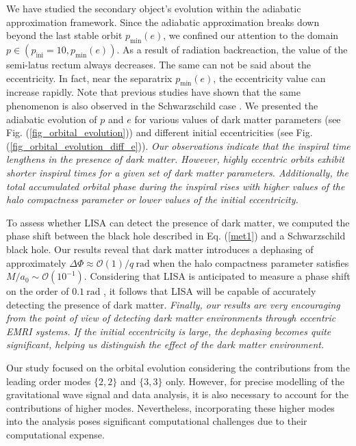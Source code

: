 \documentclass[11pt]{article}
\begin{document}
We have studied the secondary object's evolution within the adiabatic approximation framework. Since the adiabatic approximation breaks down beyond the last stable orbit $p_{\textrm{min}}(e)$, we confined our attention to the domain $p\in (p_{\textrm{ini}}=10, p_{\textrm{min}}(e))$. As a result of radiation backreaction, the value of the semi-latus rectum always decreases. The same can not be said about the eccentricity. In fact, near the separatrix $p_{\textrm{min}}(e)$, the eccentricity value can increase rapidly. Note that previous studies have shown that the same phenomenon is also observed in the Schwarzschild case \cite{PhysRevD.50.3816}. 
We presented the adiabatic evolution of $p$ and $e$ for various values of dark matter parameters (see Fig. (\ref{fig_orbital_evolution})) and different initial eccentricities (see Fig. (\ref{fig_orbital_evolution_diff_e})). \textit{Our observations indicate that the inspiral time lengthens in the presence of dark matter. However, highly eccentric orbits exhibit shorter inspiral times for a given set of dark matter parameters. Additionally, the total accumulated orbital phase during the inspiral rises with higher values of the halo compactness parameter or lower values of the initial eccentricity.}\par
To assess whether LISA can detect the presence of dark matter, we computed the phase shift between the black hole described in Eq. (\ref{met1}) and a Schwarzschild black hole. Our results reveal that dark matter introduces a dephasing of approximately $\Delta\Phi\approx \mathcal{O}(1)/q~\textrm{rad}$ when the halo compactness parameter satisfies $M/a_0\sim \mathcal{O}(10^{-1})$. Considering that LISA is anticipated to measure a phase shift on the order of $0.1~\textrm{rad}$ \cite{PhysRevLett.123.101103}, it follows that LISA will be capable of accurately detecting the presence of dark matter. \textit{Finally, our results are very encouraging from the point of view of detecting dark matter environments through eccentric EMRI systems. If the initial eccentricity is large, the dephasing becomes quite significant, helping us distinguish the effect of the dark matter environment.} \par
Our study focused on the orbital evolution considering the contributions from the leading order modes $\{2,2\}$ and $\{3,3\}$ only. However, for precise modelling of the gravitational wave signal and data analysis, it is also necessary to account for the contributions of higher modes. Nevertheless, incorporating these higher modes into the analysis poses significant computational challenges due to their computational expense.
\end{document}
